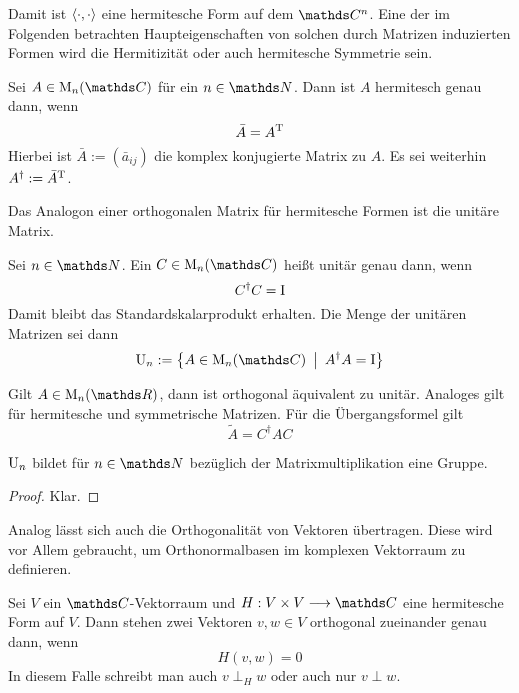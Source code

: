 			Damit ist $\left\langle \cdot,\cdot \right\rangle$ eine hermitesche Form auf dem $\SC^n$.
			Eine der im Folgenden betrachten Haupteigenschaften von solchen durch Matrizen induzierten Formen wird die Hermitizität oder auch hermitesche Symmetrie sein.

			\begin{definition}
				Sei $A\in\m{M}_n(\SC)$ für ein $n\in\SN$.
				Dann ist $A$ hermitesch genau dann, wenn
				\[ \bar{A} = A^\mathrm{T} \]
				Hierbei ist $\bar{A} := (\bar{a}_{ij})$ die komplex konjugierte Matrix zu $A$.
				Es sei weiterhin $A^\dagger := \bar{A}^\mathrm{T}$.
			\end{definition}

			Das Analogon einer orthogonalen Matrix für hermitesche Formen ist die unitäre Matrix.

			\begin{definition}
				Sei $n\in\SN$.
				Ein $C\in\m{M}_n(\SC)$ heißt unitär genau dann, wenn
				\[ C^\dagger C = \mathrm{I} \]
				Damit bleibt das Standardskalarprodukt erhalten.
				Die Menge der unitären Matrizen sei dann
				\[ \m{U}_n := \set{A\in \m{M}_n(\SC)}{ A^\dagger A = \idmat } \]
			\end{definition}

			Gilt $A\in\m{M}_n(\SR)$, dann ist orthogonal äquivalent zu unitär.
			Analoges gilt für hermitesche und symmetrische Matrizen.
			Für die Übergangsformel gilt
			\[ \tilde{A} = C^\dagger A C \]

			\begin{lemma}
				$\mathrm{U}_n$ bildet für $n\in\SN$ bezüglich der Matrixmultiplikation eine Gruppe.
			\end{lemma}
			\begin{proof}
				Klar.
			\end{proof}

			Analog lässt sich auch die Orthogonalität von Vektoren übertragen.
			Diese wird vor Allem gebraucht, um Orthonormalbasen im komplexen Vektorraum zu definieren.

			\begin{definition}
				Sei $V$ ein $\SC$-Vektorraum und $H:V\times V\longrightarrow\SC$ eine hermitesche Form auf $V$.
				Dann stehen zwei Vektoren $v,w\in V$ orthogonal zueinander genau dann, wenn 
				\[ H(v,w) = 0 \]
				In diesem Falle schreibt man auch $v\perp_H w$ oder auch nur $v\perp w$.
			\end{definition}

